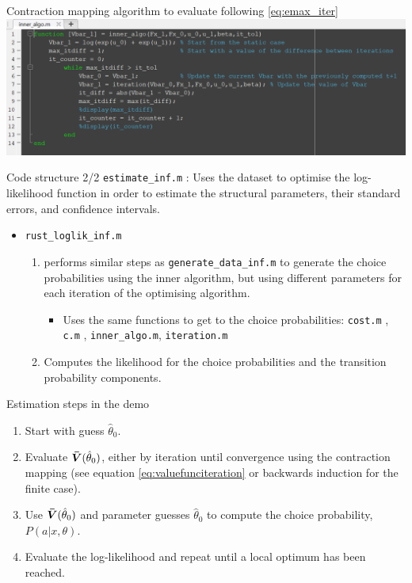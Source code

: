 \documentclass[aspectratio=169]{beamer}
\begin{document}
	\begin{frame}{Contraction mapping algorithm to evaluate following \ref{eq:emax_iter}}
		\includegraphics[width=\textwidth]{figs/3_inneralgo.PNG}
	\end{frame}
	
	\begin{frame}{Code structure 2/2}
		\texttt{estimate\_inf.m} : Uses the dataset to optimise the log-likelihood function in order to estimate the structural parameters, their standard errors, and confidence intervals.
		
		\begin{itemize}
			\item 	\texttt{rust\_loglik\_inf.m} 
			\begin{enumerate}
				\itemsep1em
				\item performs similar steps as \texttt{generate\_data\_inf.m} to generate the choice probabilities using the inner algorithm, but using different parameters for each iteration of the optimising algorithm.
				\begin{itemize}
					\itemsep1em
					
					\item Uses the same functions to get to the choice probabilities: \texttt{cost.m} , \texttt{c.m} , \texttt{inner\_algo.m}, \texttt{iteration.m} 
				\end{itemize}
				\item Computes the likelihood for the choice probabilities and the transition probability components. 
			\end{enumerate}
			
			
		\end{itemize}
	\end{frame}
	
	\begin{frame}{Estimation steps in the demo}
		\begin{enumerate}
			\itemsep1em
			\item Start with guess $\hat{\theta}_0$.
			\item Evaluate $\bm{\Bar{V}}(\hat{\theta}_0)$, either by iteration until convergence using the contraction mapping (see equation \ref{eq:valuefunciteration} or backwards induction for the finite case).
			\item Use $\bm{\Bar{V}}(\hat{\theta}_0)$ and parameter guesses $\hat{\theta}_0$ to compute the choice probability, $P(a|x,\theta)$.
			\item Evaluate the log-likelihood and repeat until a local optimum has been reached.
		\end{enumerate}
		
	\end{frame}
	
\end{document}

